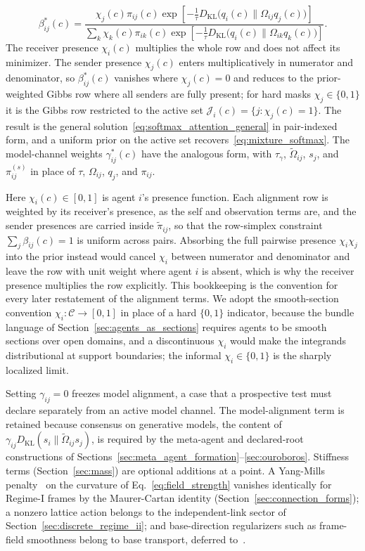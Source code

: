 \begin{equation}
\beta_{ij}^*(c) =
\frac{
  \chi_{j}(c)\pi_{ij}(c)\exp\left[
    -\tfrac{1}{\tau}D_{\mathrm{KL}}\big(q_i(c) \big\| \Omega_{ij}q_j(c)\big)
  \right]
}{
  \displaystyle\sum_{k}
  \chi_{k}(c)\pi_{ik}(c)\exp\left[
    -\tfrac{1}{\tau}D_{\mathrm{KL}}\big(q_i(c) \big\| \Omega_{ik}q_k(c)\big)
  \right]
}.
\label{eq:beta_optimal}
\end{equation}
The receiver presence $\chi_i(c)$ multiplies the whole row and does not affect its minimizer. The sender presence $\chi_j(c)$ enters multiplicatively in numerator and denominator, so $\beta^*_{ij}(c)$ vanishes where $\chi_j(c) = 0$ and reduces to the prior-weighted Gibbs row where all senders are fully present; for hard masks $\chi_j \in \{0, 1\}$ it is the Gibbs row restricted to the active set $\mathcal{J}_i(c) = \{j : \chi_j(c) = 1\}$. The result is the general solution~\eqref{eq:softmax_attention_general} in pair-indexed form, and a uniform prior on the active set recovers~\eqref{eq:mixture_softmax}. The model-channel weights $\gamma_{ij}^*(c)$ have the analogous form, with $\tau_\gamma$, $\tilde{\Omega}_{ij}$, $s_j$, and $\pi^{(s)}_{ij}$ in place of $\tau$, $\Omega_{ij}$, $q_j$, and $\pi_{ij}$.

Here $\chi_i(c) \in [0, 1]$ is agent $i$'s presence function. Each alignment row is weighted by its receiver's presence, as the self and observation terms are, and the sender presences are carried inside $\tilde{\pi}_{ij}$, so that the row-simplex constraint $\sum_j \beta_{ij}(c) = 1$ is uniform across pairs. Absorbing the full pairwise presence $\chi_i\chi_j$ into the prior instead would cancel $\chi_i$ between numerator and denominator and leave the row with unit weight where agent $i$ is absent, which is why the receiver presence multiplies the row explicitly. This bookkeeping is the convention for every later restatement of the alignment terms. We adopt the smooth-section convention $\chi_i: \mathcal{C} \to [0, 1]$ in place of a hard $\{0, 1\}$ indicator, because the bundle language of Section~\ref{sec:agents_as_sections} requires agents to be smooth sections over open domains, and a discontinuous $\chi_i$ would make the integrands distributional at support boundaries; the informal $\chi_i \in \{0, 1\}$ is the sharply localized limit.

Setting $\gamma_{ij} = 0$ freezes model alignment, a case that a prospective test must declare separately from an active model channel. The model-alignment term is retained because consensus on generative models, the content of $\gamma_{ij}D_{\mathrm{KL}}(s_i\|\tilde{\Omega}_{ij}s_j)$, is required by the meta-agent and declared-root constructions of Sections~\ref{sec:meta_agent_formation}--\ref{sec:ouroboros}. Stiffness terms (Section~\ref{sec:mass}) are optional additions at a point. A Yang-Mills penalty~\cite{Yang1954} on the curvature of Eq.~\eqref{eq:field_strength} vanishes identically for Regime-I frames by the Maurer-Cartan identity (Section~\ref{sec:connection_forms}); a nonzero lattice action belongs to the independent-link sector of Section~\ref{sec:discrete_regime_ii}; and base-direction regularizers such as frame-field smoothness belong to base transport, deferred to~\cite[Ch.~B4]{DennisGaugeVFESuppB2026}.


